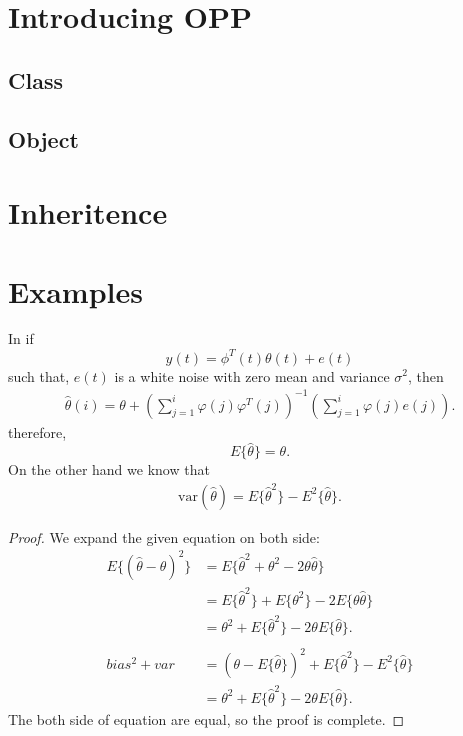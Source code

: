 \section{Introducing OPP}
    \subsection{Class}

    \subsection{Object}

\section{Inheritence}

\section{Examples}

In  if 
\begin{equation}
    y(t)=\phi^T(t)\theta(t) + e(t)
\end{equation}
such that, $e(t)$ is a white noise with zero mean and variance $\sigma^2$, then
\begin{align*}
    \hat{\theta}(i) = \theta + \left(\sum_{j=1}^{i}\varphi(j)\varphi^T(j)\right)^{-1}\left(\sum_{j=1}^{i}\varphi(j)e(j)\right).
\end{align*}
therefore, 
\begin{equation}
    E\{\hat{\theta}\}=\theta .
\end{equation}
On the other hand we know that
\begin{align}
    \mathrm{var}(\hat{\theta}) = E\{\hat{\theta}^2\} - E^2\{\hat{\theta}\}.
\end{align}
\begin{proof}
We expand the given equation on both side:
\begin{align}
    E\{(\hat{\theta}-\theta)^2\} &= E\{\hat{\theta}^2 + \theta^2 - 2\theta\hat{\theta}\}\\
    &= E\{\hat{\theta}^2\} + E\{\theta^2\} - 2E\{\theta\hat{\theta}\} \nonumber\\
    &= \theta^2 + E\{\hat{\theta}^2\} - 2\theta E\{\hat{\theta}\}.\nonumber\\
    &\nonumber\\
    bias^2 + var &= (\theta - E\{\hat{\theta}\})^2 + E\{\hat{\theta}^2\} - E^2\{\hat{\theta}\}\\
    &= \theta^2 + E\{\hat{\theta}^2\} - 2\theta E\{\hat{\theta}\}.\nonumber
\end{align}
The both side of equation are equal, so the proof is complete.
\end{proof}